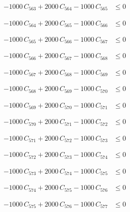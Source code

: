 \documentclass[a4paper,11pt]{article}
\begin{document}
\begin{align}
-1000\,C_{563} + 2000\,C_{564} - 1000\,C_{565} &\leq 0 \nonumber
\end{align}

\begin{align}
-1000\,C_{564} + 2000\,C_{565} - 1000\,C_{566} &\leq 0 \nonumber
\end{align}

\begin{align}
-1000\,C_{565} + 2000\,C_{566} - 1000\,C_{567} &\leq 0 \nonumber
\end{align}

\begin{align}
-1000\,C_{566} + 2000\,C_{567} - 1000\,C_{568} &\leq 0 \nonumber
\end{align}

\begin{align}
-1000\,C_{567} + 2000\,C_{568} - 1000\,C_{569} &\leq 0 \nonumber
\end{align}

\begin{align}
-1000\,C_{568} + 2000\,C_{569} - 1000\,C_{570} &\leq 0 \nonumber
\end{align}

\begin{align}
-1000\,C_{569} + 2000\,C_{570} - 1000\,C_{571} &\leq 0 \nonumber
\end{align}

\begin{align}
-1000\,C_{570} + 2000\,C_{571} - 1000\,C_{572} &\leq 0 \nonumber
\end{align}

\begin{align}
-1000\,C_{571} + 2000\,C_{572} - 1000\,C_{573} &\leq 0 \nonumber
\end{align}

\begin{align}
-1000\,C_{572} + 2000\,C_{573} - 1000\,C_{574} &\leq 0 \nonumber
\end{align}

\begin{align}
-1000\,C_{573} + 2000\,C_{574} - 1000\,C_{575} &\leq 0 \nonumber
\end{align}

\begin{align}
-1000\,C_{574} + 2000\,C_{575} - 1000\,C_{576} &\leq 0 \nonumber
\end{align}

\begin{align}
-1000\,C_{575} + 2000\,C_{576} - 1000\,C_{577} &\leq 0 \nonumber
\end{align}
\end{document}
